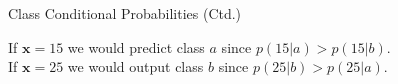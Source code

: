 \begin{frame}{Class Conditional Probabilities (Ctd.)}{}
	\vspace*{3mm}
	\begin{boxBlueNoFrame}
		If $\bm{x} = 15$ we would predict class $a$ since $p(15 \vert a) > p(15 \vert b)$. \\
		If $\bm{x} = 25$ we would output class $b$ since $p(25 \vert b) > p(25 \vert a)$.
	\end{boxBlueNoFrame}
\end{frame}


